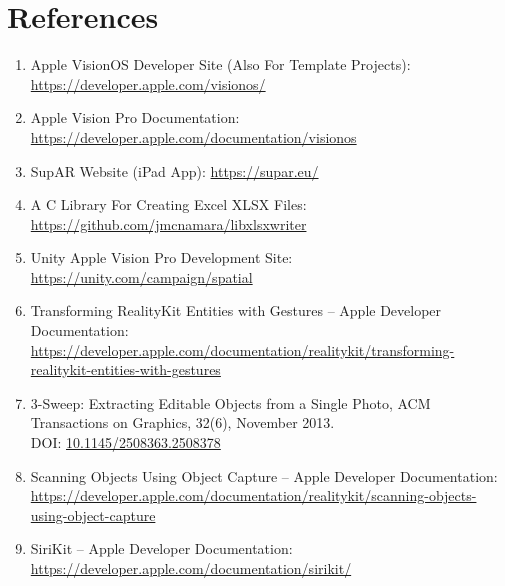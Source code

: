 \chapter*{References}

\begin{enumerate}
    \item Apple VisionOS Developer Site (Also For Template Projects): \url{https://developer.apple.com/visionos/}
    \item Apple Vision Pro Documentation: \url{https://developer.apple.com/documentation/visionos}
    \item SupAR Website (iPad App): \url{https://supar.eu/}
    \item A C Library For Creating Excel XLSX Files: \url{https://github.com/jmcnamara/libxlsxwriter}
    \item Unity Apple Vision Pro Development Site: \url{https://unity.com/campaign/spatial}
    \item Transforming RealityKit Entities with Gestures – Apple Developer Documentation: \url{https://developer.apple.com/documentation/realitykit/transforming-realitykit-entities-with-gestures}
    \item 3-Sweep: Extracting Editable Objects from a Single Photo, ACM Transactions on Graphics, 32(6), November 2013.\\
        DOI: \url{10.1145/2508363.2508378}
    \item Scanning Objects Using Object Capture – Apple Developer Documentation: \url{https://developer.apple.com/documentation/realitykit/scanning-objects-using-object-capture}
    \item SiriKit – Apple Developer Documentation: \url{https://developer.apple.com/documentation/sirikit/}
\end{enumerate}
